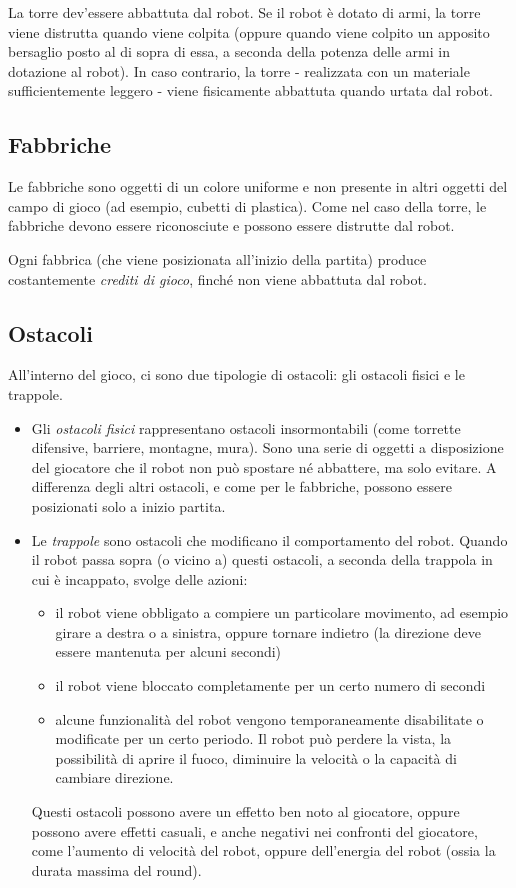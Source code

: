 La torre dev'essere abbattuta dal robot. Se il robot è dotato di armi, la torre viene distrutta quando viene colpita (oppure quando viene colpito un apposito bersaglio posto al di sopra di essa, a seconda della potenza delle armi in dotazione al robot). In caso contrario, la torre - realizzata con un materiale sufficientemente leggero - viene fisicamente abbattuta quando urtata dal robot.

\subsection*{Fabbriche} Le fabbriche sono oggetti di un colore uniforme e non presente in altri oggetti del campo di gioco (ad esempio, cubetti di plastica). Come nel caso della torre, le fabbriche devono essere riconosciute e possono essere distrutte dal robot.

Ogni fabbrica (che viene posizionata all'inizio della partita) produce costantemente \emph{crediti di gioco}, finché non viene abbattuta dal robot.

\subsection*{Ostacoli} All'interno del gioco, ci sono due tipologie di ostacoli: gli ostacoli fisici e le trappole.
	\begin{itemize}
	\item Gli \emph{ostacoli fisici} rappresentano ostacoli insormontabili (come torrette difensive, barriere, montagne, mura). Sono una serie di oggetti a disposizione del giocatore che il robot non può spostare né abbattere, ma solo evitare. A differenza degli altri ostacoli, e come per le fabbriche, possono essere posizionati solo a inizio partita.
	\item Le \emph{trappole} sono ostacoli che modificano il comportamento del robot. Quando il robot passa sopra (o vicino a) questi ostacoli, a seconda della trappola in cui è incappato, svolge delle azioni:
		\begin{itemize}
		\item il robot viene obbligato a compiere un particolare movimento, ad esempio girare a destra o a sinistra, oppure tornare indietro (la direzione deve essere mantenuta per alcuni secondi)
		\item il robot viene bloccato completamente per un certo numero di secondi
		\item alcune funzionalità del robot vengono temporaneamente disabilitate o modificate per un certo periodo. Il robot può perdere la vista, la possibilità di aprire il fuoco, diminuire la velocità o la capacità di cambiare direzione.
		\end{itemize}
	Questi ostacoli possono avere un effetto ben noto al giocatore, oppure possono avere effetti casuali, e anche negativi nei confronti del giocatore, come l'aumento di velocità del robot, oppure dell'energia del robot (ossia la durata massima del round).
	\end{itemize}


